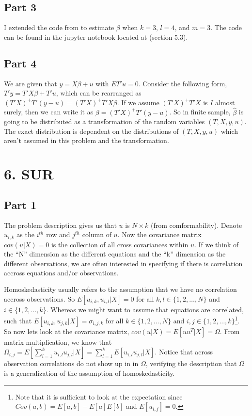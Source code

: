\documentclass[10pt]{report}
\begin{document}
\subsection*{Part 3}
I extended the code from  to estimate $\beta$ when $k=3$, $l=4$, and $m=3$. The code can be found in the jupyter notebook located at  (section 5.3).

\subsection*{Part 4}
We are given that $y = X\beta + u$ with $ET'u = 0$. Consider the following form, $T'y = T'X\beta + T'u$, which can be rearranged as $(T'X)^+ T'(y-u) = (T'X)^+ T'X \beta$. If we assume $(T'X)^+ T'X$ is $I$ almost surely, then we can write it as $\beta = (T'X)^+ T'(y-u)$. So in finite sample, $\hat{\beta}$ is going to be distributed as a transformation of the random variables $(T, X, y, u)$. The exact distribution is dependent on the distributions of $(T, X, y, u)$ which aren't assumed in this problem and the transformation.



\section*{6. SUR}
\subsection*{Part 1}
The problem description gives us that $u$ is $N \times k$ (from comformability). Denote $u_{i, k}$ as the $i^{th}$ row and $j^{th}$ column of $u$. Now the covariance matrix $cov(u|X)=0$ is the collection of all cross covariances within $u$. If we think of the ``N'' dimension as the different equations and the ``k'' dimension as the different observations, we are often interested in specifying if there is correlation accross equations and/or observations. 

Homoskedasticity usually refers to the assumption that we have no correlation accross observations. So $E[u_{i,k}, u_{i, l}|X] = 0$ for all $k, l \in \{1, 2, \ldots, N\}$ and $i \in \{1, 2, \ldots, k\}$. Whereas we might want to assume that equations are correlated, such that $E[u_{i,k}, u_{j,k}|X] = \sigma_{i,j, k}$ for all $k \in \{1, 2, \ldots, N\}$ and $i,j \in \{1, 2, \ldots, k\}$\footnote{Note that it is sufficient to look at the expectation since $Cov(a, b) = E[a, b]-E[a]E[b]$ and $E[u_{i,j}]=0$.}. So now lets look at the covariance matrix, $cov(u|X) = E[u u^T |X] = \Omega$. From matrix multiplication, we know that $\Omega_{i,j} = E[\sum_{l=1}^k u_{i,l} u_{j,l}|X] = \sum_{l=1}^k E[u_{i,l} u_{j,l}|X]$. Notice that across observation correlations do not show up in in $\Omega$, verifying the description that $\Omega$ is a generalization of the assumption of homoskedasticity.
\end{document}
